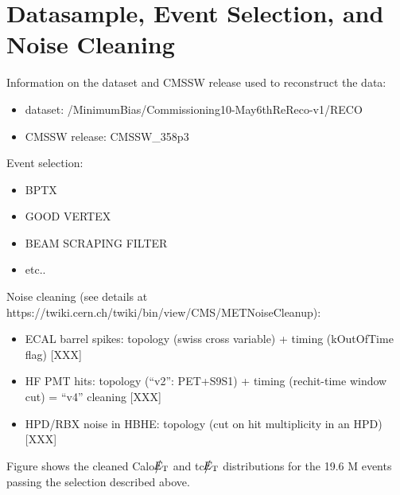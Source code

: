 \section{Datasample, Event Selection, and Noise Cleaning} \label{sec:EventSelection}

Information on the dataset and CMSSW release used to reconstruct the data:
\begin{itemize}
\item dataset: /MinimumBias/Commissioning10-May6thReReco-v1/RECO
\item CMSSW release: CMSSW\_358p3
\end{itemize}

Event selection:
\begin{itemize}
\item BPTX  
\item GOOD VERTEX
\item BEAM SCRAPING FILTER
\item etc..
\end{itemize}

Noise cleaning (see details at https://twiki.cern.ch/twiki/bin/view/CMS/METNoiseCleanup):
\begin{itemize}
\item ECAL barrel spikes: topology (swiss cross variable) + timing (kOutOfTime flag) [XXX]
\item HF PMT hits: topology (``v2'': PET+S9S1) + timing (rechit-time window cut) = ``v4'' cleaning [XXX]
\item HPD/RBX noise in HBHE: topology (cut on hit multiplicity in an HPD) [XXX]
\end{itemize}

Figure shows the cleaned Calo$\big\slash\hspace{-1.6ex}{E_\text{T}}$ and tc$\big\slash\hspace{-1.6ex}{E_\text{T}}$ distributions for the 19.6 M 
events passing the selection described above.

